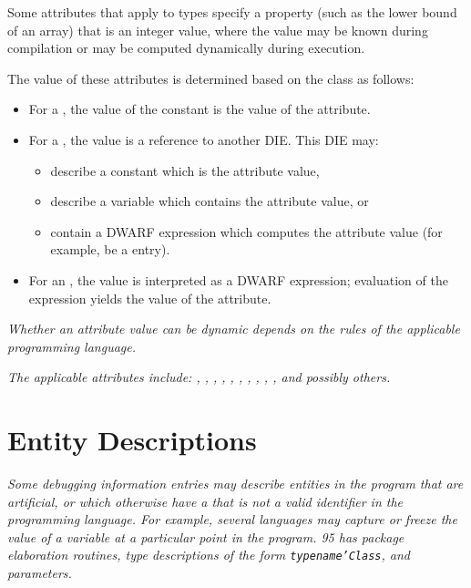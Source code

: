 Some attributes that apply to types specify a property (such
as the lower bound of an array) that is an integer value,
where the value may be known during compilation or may be
computed dynamically during execution.

The value of these
attributes is determined based on the class as follows:
\begin{itemize}
\item For a , the value of the constant is the value of
the attribute.

\item For a , the
value is a reference to another DIE.  This DIE may:
\begin{itemize}
\renewcommand{\itemsep}{0cm}
\item describe a constant which is the attribute value,
\item describe a variable which contains the attribute value, or
\item contain a DWARF expression which computes the attribute value
      (for example, be a \DWTAGdwarfprocedure{} entry).
\end{itemize}

\item For an , the value is interpreted as a 
DWARF expression; 
evaluation of the expression yields the value of
the attribute.
\end{itemize}

\textit{%
Whether an attribute value can be dynamic depends on the
rules of the applicable programming language.
}

\textit{The applicable attributes include: 
\DWATallocated,
\DWATassociated, 
\DWATbitsize,
\DWATbitstride,
\DWATbytesize,
\DWATbytestride, 
\DWATcount, 
\DWATlowerbound,
\DWATrank,
\DWATupperbound,
and possibly others.}

\section{Entity Descriptions}
\textit{Some debugging information entries may describe entities
in the program that are artificial, or which otherwise have a 
 that is not a valid identifier in the
programming language. For example, several languages may
capture or freeze the value of a variable at a particular
point in the program. 
 95 has package elaboration routines,
type descriptions of the form \texttt{typename\textquoteright Class}, and 
 parameters.  }

